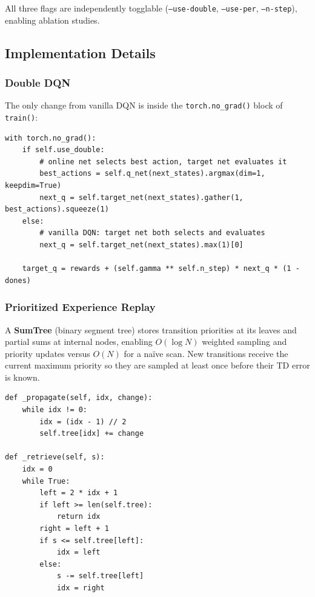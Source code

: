 \documentclass[12pt, a4paper]{report}
\begin{document}
All three flags are independently togglable (\texttt{--use-double}, \texttt{--use-per},
\texttt{--n-step}), enabling ablation studies.

\subsection{Implementation Details}

\subsubsection*{Double DQN}

The only change from vanilla DQN is inside the \texttt{torch.no\_grad()} block of \texttt{train()}:

\begin{lstlisting}[caption={Double DQN target computation.}]
with torch.no_grad():
    if self.use_double:
        # online net selects best action, target net evaluates it
        best_actions = self.q_net(next_states).argmax(dim=1, keepdim=True)
        next_q = self.target_net(next_states).gather(1, best_actions).squeeze(1)
    else:
        # vanilla DQN: target net both selects and evaluates
        next_q = self.target_net(next_states).max(1)[0]

    target_q = rewards + (self.gamma ** self.n_step) * next_q * (1 - dones)
\end{lstlisting}

\subsubsection*{Prioritized Experience Replay}

A \textbf{SumTree} (binary segment tree) stores transition priorities at its leaves and partial sums
at internal nodes, enabling $O(\log N)$ weighted sampling and priority updates versus $O(N)$ for a
naïve scan. New transitions receive the current maximum priority so they are sampled at least once
before their TD error is known.

\begin{lstlisting}[caption={SumTree core: propagate and retrieve.}]
def _propagate(self, idx, change):
    while idx != 0:
        idx = (idx - 1) // 2
        self.tree[idx] += change

def _retrieve(self, s):
    idx = 0
    while True:
        left = 2 * idx + 1
        if left >= len(self.tree):
            return idx
        right = left + 1
        if s <= self.tree[left]:
            idx = left
        else:
            s -= self.tree[left]
            idx = right
\end{lstlisting}
\end{document}
